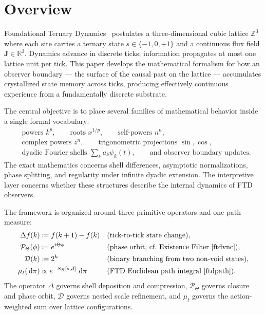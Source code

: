\documentclass[11pt]{article}
\theoremstyle{tight}
\theoremstyle{plainroman}
\newcommand{\R}{\mathbb{R}}
\newcommand{\Z}{\mathbb{Z}}
\newcommand{\dd}{\,\mathrm{d}}
\begin{document}
\section{Overview}
Foundational Ternary Dynamics~\cite{ftdspec} postulates a three-dimensional cubic lattice $\Z^3$ where each site carries a ternary state $s\in\{-1,0,+1\}$ and a continuous flux field $\mathbf J\in\R^3$.
Dynamics advance in discrete ticks; information propagates at most one lattice unit per tick.
This paper develops the mathematical formalism for how an observer boundary --- the surface of the causal past on the lattice --- accumulates crystallized state memory across ticks, producing effectively continuous experience from a fundamentally discrete substrate.

The central objective is to place several families of mathematical behavior inside a single formal vocabulary:
\begin{align*}
&\text{powers } k^p, \qquad \text{roots } x^{1/p}, \qquad \text{self-powers } n^n,\\
&\text{complex powers } z^n, \qquad \text{trigonometric projections } \sin,\cos,\\
&\text{dyadic Fourier shells } \sum_k a_k\psi_k(t), \qquad \text{and observer boundary updates.}
\end{align*}
The exact mathematics concerns shell differences, asymptotic normalizations, phase splitting, and regularity under infinite dyadic extension.
The interpretive layer concerns whether these structures describe the internal dynamics of FTD observers.

The framework is organized around three primitive operators and one path measure:
\begin{align*}
\Delta f(k) &\coloneqq f(k+1)-f(k) &&\text{(tick-to-tick state change)},\\
\mathcal P_{\Theta}(\phi) &\coloneqq e^{i\Theta \phi} &&\text{(phase orbit, cf.\ Existence Filter~\cite{ftdvnc})},\\
\mathcal D(k) &\coloneqq 2^k &&\text{(binary branching from two non-void states)},\\
\mu_t(\dd \pi) &\propto e^{-S_E[s,\mathbf J]}\,\dd \pi &&\text{(FTD Euclidean path integral~\cite{ftdpath})}.
\end{align*}
The operator $\Delta$ governs shell deposition and compression, $\mathcal P_{\Theta}$ governs closure and phase orbit, $\mathcal D$ governs nested scale refinement, and $\mu_t$ governs the action-weighted sum over lattice configurations.
\end{document}
